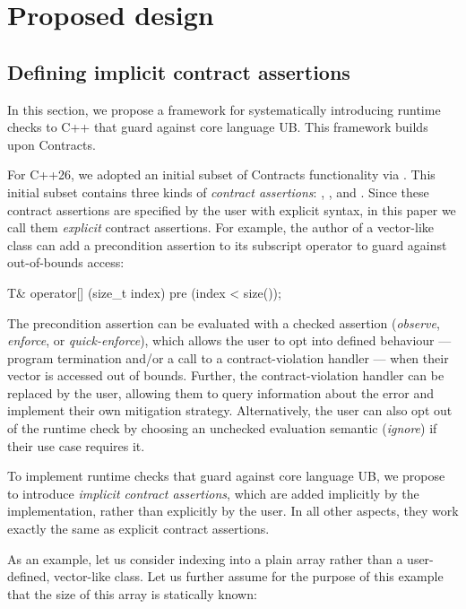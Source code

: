 {\section{Proposed design}
\label{design}

\subsection{Defining implicit contract assertions}
\label{defineicas}

In this section, we propose a framework for systematically introducing runtime checks to C++ that guard against core language UB. This framework builds upon Contracts.

For C++26, we adopted an initial subset of Contracts functionality via \cite{P2900R14}. This initial subset contains three kinds of \emph{contract assertions}: , , and . Since these contract assertions are specified by the user with explicit syntax, in this paper we call them \emph{explicit} contract assertions. For example, the author of a vector-like class can add a precondition assertion to its subscript operator to guard against out-of-bounds access:

\begin{codeblock}
T& operator[] (size_t index)
  pre (index < size());
\end{codeblock}

The precondition assertion  can be evaluated with a checked assertion  (\emph{observe}, \emph{enforce}, or \emph{quick-enforce}), which allows the user to opt into defined behaviour --- program termination and/or a call to a contract-violation handler --- when their vector is accessed out of bounds. Further, the contract-violation handler can be replaced by the user, allowing them to query information about the error and implement their own mitigation strategy. Alternatively, the user can also opt out of the runtime check by choosing an unchecked evaluation semantic (\emph{ignore}) if their use case requires it.

To implement runtime checks that guard against core language UB, we propose to introduce \emph{implicit contract assertions}, which are added implicitly by the implementation, rather than explicitly by the user. In all other aspects, they work exactly the same as explicit contract assertions.

As an example, let us consider indexing into a plain array rather than a user-defined, vector-like class. Let us further assume for the purpose of this example that the size  of this array is statically known:

}
